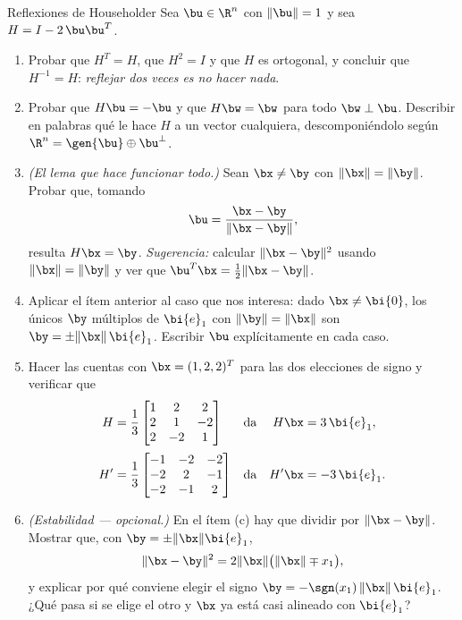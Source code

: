 \begin{entrega}{Reflexiones de Householder}\label{ent:householder}
Sea $\bu\in\R^n$ con $\|\bu\|=1$ y sea $H=I-2\,\bu\bu^T$.

\begin{enumerate}[label=\textbf{(\alph*)},itemsep=3pt,topsep=4pt]
\item Probar que $H^T=H$, que $H^2=I$ y que $H$ es ortogonal, y concluir que
$H^{-1}=H$: \emph{reflejar dos veces es no hacer nada}.

\item Probar que $H\bu=-\bu$ y que $H\bw=\bw$ para todo $\bw\perp\bu$.
Describir en palabras qué le hace $H$ a un vector cualquiera, descomponiéndolo
según $\R^n=\gen\{\bu\}\oplus\bu^{\perp}$.

\item \emph{(El lema que hace funcionar todo.)} Sean $\bx\neq\by$ con
$\|\bx\|=\|\by\|$. Probar que, tomando
\[
\bu=\frac{\bx-\by}{\|\bx-\by\|},
\]
resulta $H\bx=\by$. \emph{Sugerencia:} calcular $\|\bx-\by\|^2$ usando
$\|\bx\|=\|\by\|$ y ver que $\bu^T\bx=\tfrac12\|\bx-\by\|$.

\item Aplicar el ítem anterior al caso que nos interesa: dado
$\bx\neq\bi{0}$, los únicos
$\by$ múltiplos de $\bi{e}_1$ con $\|\by\|=\|\bx\|$ son
$\by=\pm\|\bx\|\,\bi{e}_1$. Escribir $\bu$ explícitamente en cada caso.

\item Hacer las cuentas con $\bx=(1,2,2)^T$ para las dos elecciones de signo
y verificar que
\begin{align*}
H&=\frac13\begin{bmatrix}1&2&2\\2&1&-2\\2&-2&1\end{bmatrix}
&&\text{da}& H\bx&=3\,\bi{e}_1,\\[2pt]
H'&=\frac13\begin{bmatrix}-1&-2&-2\\-2&2&-1\\-2&-1&2\end{bmatrix}
&&\text{da}& H'\bx&=-3\,\bi{e}_1 .
\end{align*}

\item \emph{(Estabilidad --- opcional.)} En el ítem (c) hay que dividir por
$\|\bx-\by\|$. Mostrar que, con $\by=\pm\|\bx\|\bi{e}_1$,
\[
\|\bx-\by\|^2 = 2\|\bx\|\big(\|\bx\|\mp x_1\big),
\]
y explicar por qué conviene elegir el signo
$\by=-\sgn(x_1)\,\|\bx\|\,\bi{e}_1$. ¿Qué pasa si se elige el otro y $\bx$
ya está casi alineado con $\bi{e}_1$?


\end{enumerate}
\end{entrega}
